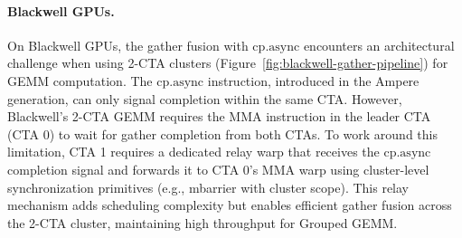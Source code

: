 \paragraph{Blackwell GPUs.} On Blackwell GPUs, the gather fusion with $\mathrm{cp.async}$ encounters an architectural challenge when using 2-CTA clusters (Figure~\ref{fig:blackwell-gather-pipeline}) for GEMM computation. The $\mathrm{cp.async}$ instruction, introduced in the Ampere generation, can only signal completion within the same CTA. However, Blackwell's 2-CTA GEMM requires the MMA instruction in the leader CTA (CTA 0) to wait for gather completion from both CTAs. To work around this limitation, CTA 1 requires a dedicated relay warp that receives the $\mathrm{cp.async}$ completion signal and forwards it to CTA 0's MMA warp using cluster-level synchronization primitives (e.g., mbarrier with cluster scope). This relay mechanism adds scheduling complexity but enables efficient gather fusion across the 2-CTA cluster, maintaining high throughput for Grouped GEMM.
















